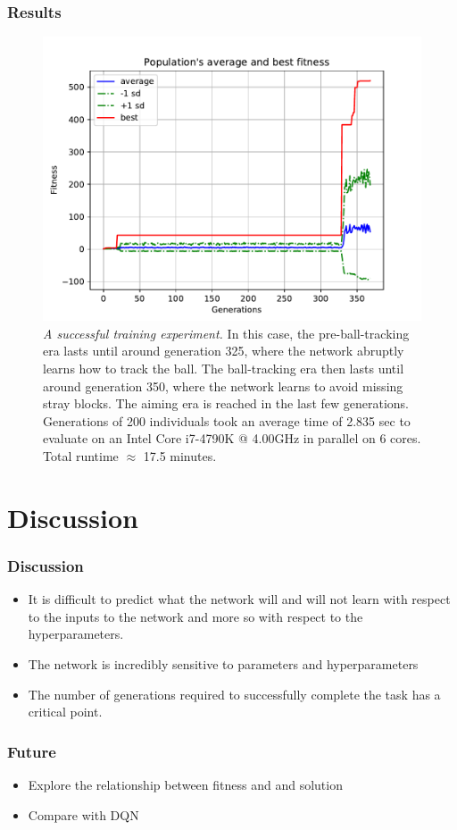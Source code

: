 \documentclass[t,pdflatex]{beamer}
\begin{document}
    \begin{frame}

        \frametitle{Results}
         \begin{figure}[h!]
            \centering
            \includegraphics[width=.54 \textwidth]{avg_fitness.pdf}
            \caption{\textit{A successful training experiment.} In this case, the pre-ball-tracking era lasts
                until around generation 325, where the network abruptly learns how to track the ball.
                The ball-tracking era then lasts until around generation 350, where the network learns to avoid missing stray blocks. The aiming era is reached in the last few generations.
                Generations of 200 individuals took an average time of 2.835 sec to evaluate on an
                Intel Core i7-4790K @ 4.00GHz in parallel on 6 cores. Total runtime $\approx$ 17.5 minutes.}
        \end{figure}

    \end{frame}

\section{Discussion}

        \begin{frame}

        \frametitle{Discussion}
         \begin{itemize}
             \item It is difficult to predict what the network will and will not learn with respect to the inputs to the network and more so with respect to the hyperparameters.
             \item The network is incredibly sensitive to parameters and hyperparameters
             \item The number of generations required to successfully complete the task has a critical point.
         \end{itemize}

    \end{frame}

        \begin{frame}

        \frametitle{Future}
        \begin{itemize}
            \item Explore the relationship between fitness and and solution
            \item Compare with DQN
        \end{itemize}


    \end{frame}
\end{document}
